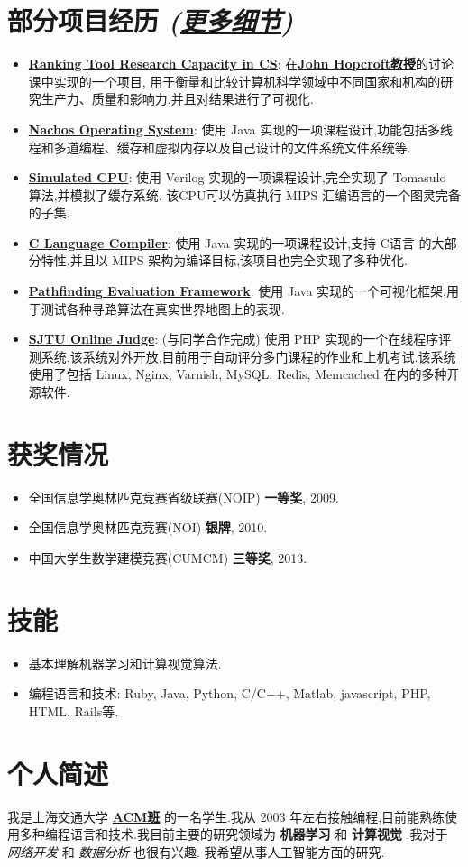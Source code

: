 \documentclass[letterpaper]{article}
\begin{document}
\section*{部分项目经历 \normalsize{\it(\href{https://github.com/lostleaf?tab=repositories}{更多细节})}}
\begin{itemize}
\item \textbf{\href{http://acm.sjtu.edu.cn/ricsrt/}{Ranking Tool Research Capacity in CS}}:
在\textbf{\href{http://www.cs.cornell.edu/jeh/}{John Hopcroft教授}}的讨论课中实现的一个项目, 用于衡量和比较计算机科学领域中不同国家和机构的研究生产力、质量和影响力,并且对结果进行了可视化.
\item \textbf{\href{https://github.com/lostleaf/nachos}{Nachos Operating System}}: 
使用 Java 实现的一项课程设计,功能包括多线程和多道编程、缓存和虚拟内存以及自己设计的文件系统文件系统等.
\item \textbf{\href{https://github.com/lostleaf/cpu}{Simulated CPU}}:
使用 Verilog 实现的一项课程设计,完全实现了 Tomasulo 算法,并模拟了缓存系统. 该CPU可以仿真执行 MIPS 汇编语言的一个图灵完备的子集.
\item \textbf{\href{https://github.com/lostleaf/compiler}{C Language Compiler}}:
使用 Java 实现的一项课程设计,支持 C语言 的大部分特性,并且以 MIPS 架构为编译目标,该项目也完全实现了多种优化.
\item \textbf{\href{https://github.com/lostleaf/Pathfinding-Evaluation}{Pathfinding Evaluation Framework}}:
使用 Java 实现的一个可视化框架,用于测试各种寻路算法在真实世界地图上的表现.
\item \textbf{\href{http://acm.sjtu.edu.cn/OnlineJudge/}{SJTU Online Judge}}: 
(与同学合作完成) 使用 PHP 实现的一个在线程序评测系统,该系统对外开放,目前用于自动评分多门课程的作业和上机考试.该系统使用了包括 Linux, Nginx, Varnish, MySQL, Redis, Memcached 在内的多种开源软件.
\end{itemize}

\section*{获奖情况}
\begin{itemize}
\item 全国信息学奥林匹克竞赛省级联赛(NOIP) \textbf{一等奖}, 2009. 
\item 全国信息学奥林匹克竞赛(NOI) \textbf{银牌}, 2010. 
\item 中国大学生数学建模竞赛(CUMCM) \textbf{三等奖}, 2013. 
\end{itemize}

\section*{技能}
\begin{itemize}
\item 基本理解机器学习和计算视觉算法.
\item 编程语言和技术: Ruby, Java, Python, C/C++, Matlab, javascript, PHP, HTML, Rails等.
\end{itemize}

\section*{个人简述}
我是上海交通大学 \textbf{\href{http://acm.sjtu.edu.cn}{ACM班}} 的一名学生.我从 2003 年左右接触编程,目前能熟练使用多种编程语言和技术.我目前主要的研究领域为 \textbf{机器学习} 和 \textbf{计算视觉} .我对于 {\it 网络开发} 和 {\it 数据分析} 也很有兴趣. 我希望从事人工智能方面的研究.
\end{document}
